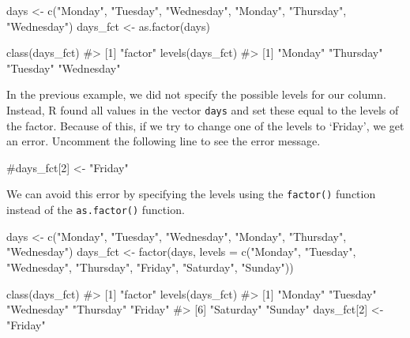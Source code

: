 \documentclass[
  letterpaper,
]{latex/krantz}
\makeatletter
\newenvironment{Shaded}{\begin{snugshade}}{\end{snugshade}}
\newcommand{\AttributeTok}[1]{\textcolor[rgb]{0.40,0.45,0.13}{#1}}
\newcommand{\CommentTok}[1]{\textcolor[rgb]{0.37,0.37,0.37}{#1}}
\newcommand{\DecValTok}[1]{\textcolor[rgb]{0.68,0.00,0.00}{#1}}
\newcommand{\FunctionTok}[1]{\textcolor[rgb]{0.28,0.35,0.67}{#1}}
\newcommand{\NormalTok}[1]{\textcolor[rgb]{0.00,0.23,0.31}{#1}}
\newcommand{\OtherTok}[1]{\textcolor[rgb]{0.00,0.23,0.31}{#1}}
\newcommand{\StringTok}[1]{\textcolor[rgb]{0.13,0.47,0.30}{#1}}
\newenvironment{kframe}{%
\medskip{}
\setlength{\fboxsep}{.8em}
 \def\at@end@of@kframe{}%
 \ifinner\ifhmode%
  \def\at@end@of@kframe{\end{minipage}}%
  \begin{minipage}{\columnwidth}%
 \fi\fi%
 \def\FrameCommand##1{\hskip\@totalleftmargin \hskip-\fboxsep
 \colorbox{shadecolor}{##1}\hskip-\fboxsep
     \hskip-\linewidth \hskip-\@totalleftmargin \hskip\columnwidth}%
 \MakeFramed {\advance\hsize-\width
   \@totalleftmargin\z@ \linewidth\hsize
   \@setminipage}}%
 {\par\unskip\endMakeFramed%
 \at@end@of@kframe}
\renewenvironment{Shaded}{\begin{kframe}}{\end{kframe}}
\makeatother
\begin{document}
\begin{Shaded}
\begin{Highlighting}[]
\NormalTok{days }\OtherTok{\textless{}{-}} \FunctionTok{c}\NormalTok{(}\StringTok{"Monday"}\NormalTok{, }\StringTok{"Tuesday"}\NormalTok{, }\StringTok{"Wednesday"}\NormalTok{, }\StringTok{"Monday"}\NormalTok{, }
          \StringTok{"Thursday"}\NormalTok{, }\StringTok{"Wednesday"}\NormalTok{)}
\NormalTok{days\_fct }\OtherTok{\textless{}{-}} \FunctionTok{as.factor}\NormalTok{(days)}

\FunctionTok{class}\NormalTok{(days\_fct)}
\CommentTok{\#\textgreater{} [1] "factor"}
\FunctionTok{levels}\NormalTok{(days\_fct)}
\CommentTok{\#\textgreater{} [1] "Monday"    "Thursday"  "Tuesday"   "Wednesday"}
\end{Highlighting}
\end{Shaded}

In the previous example, we did not specify the possible levels for our
column. Instead, R found all values in the vector \texttt{days} and set
these equal to the levels of the factor. Because of this, if we try to
change one of the levels to `Friday', we get an error. Uncomment the
following line to see the error message.

\begin{Shaded}
\begin{Highlighting}[]
\CommentTok{\#days\_fct[2] \textless{}{-} "Friday"   }
\end{Highlighting}
\end{Shaded}

We can avoid this error by specifying the levels using the
\texttt{factor()} function
instead of the \texttt{as.factor()} function.

\begin{Shaded}
\begin{Highlighting}[]
\NormalTok{days }\OtherTok{\textless{}{-}} \FunctionTok{c}\NormalTok{(}\StringTok{"Monday"}\NormalTok{, }\StringTok{"Tuesday"}\NormalTok{, }\StringTok{"Wednesday"}\NormalTok{, }\StringTok{"Monday"}\NormalTok{, }\StringTok{"Thursday"}\NormalTok{, }
          \StringTok{"Wednesday"}\NormalTok{)}
\NormalTok{days\_fct }\OtherTok{\textless{}{-}} \FunctionTok{factor}\NormalTok{(days, }
               \AttributeTok{levels =} \FunctionTok{c}\NormalTok{(}\StringTok{"Monday"}\NormalTok{, }\StringTok{"Tuesday"}\NormalTok{, }\StringTok{"Wednesday"}\NormalTok{, }
                          \StringTok{"Thursday"}\NormalTok{, }\StringTok{"Friday"}\NormalTok{, }\StringTok{"Saturday"}\NormalTok{, }\StringTok{"Sunday"}\NormalTok{))}

\FunctionTok{class}\NormalTok{(days\_fct)}
\CommentTok{\#\textgreater{} [1] "factor"}
\FunctionTok{levels}\NormalTok{(days\_fct)}
\CommentTok{\#\textgreater{} [1] "Monday"    "Tuesday"   "Wednesday" "Thursday"  "Friday"   }
\CommentTok{\#\textgreater{} [6] "Saturday"  "Sunday"}
\NormalTok{days\_fct[}\DecValTok{2}\NormalTok{] }\OtherTok{\textless{}{-}} \StringTok{"Friday"}
\end{Highlighting}
\end{Shaded}
\end{document}
